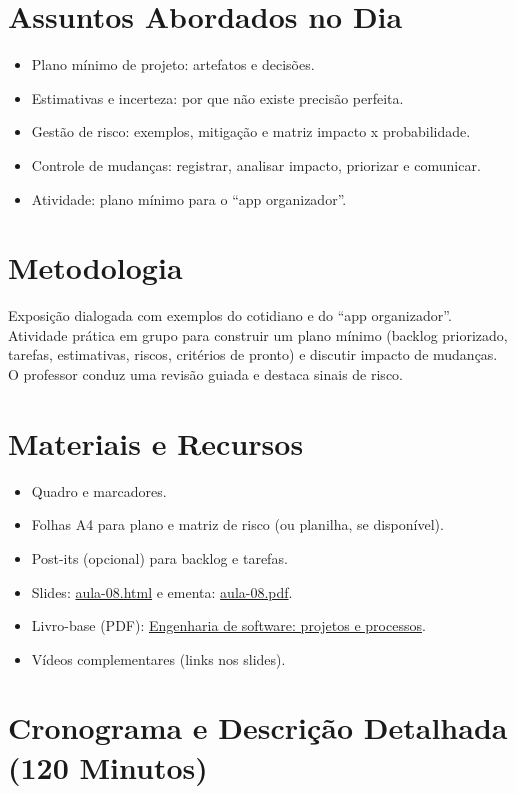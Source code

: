 \documentclass[12pt,a4paper]{article}
\begin{document}
\section{Assuntos Abordados no Dia}
\begin{itemize}[leftmargin=*,itemsep=0.25em]
  \item Plano mínimo de projeto: artefatos e decisões.
  \item Estimativas e incerteza: por que não existe precisão perfeita.
  \item Gestão de risco: exemplos, mitigação e matriz impacto x probabilidade.
  \item Controle de mudanças: registrar, analisar impacto, priorizar e comunicar.
  \item Atividade: plano mínimo para o ``app organizador''.
\end{itemize}

\section{Metodologia}
Exposição dialogada com exemplos do cotidiano e do ``app organizador''. Atividade prática em grupo para construir um plano mínimo (backlog priorizado, tarefas, estimativas, riscos, critérios de pronto) e discutir impacto de mudanças. O professor conduz uma revisão guiada e destaca sinais de risco.

\section{Materiais e Recursos}
\begin{itemize}[leftmargin=*,itemsep=0.25em]
  \item Quadro e marcadores.
  \item Folhas A4 para plano e matriz de risco (ou planilha, se disponível).
  \item Post-its (opcional) para backlog e tarefas.
  \item Slides: \href{aula-08.html}{aula-08.html} e ementa: \href{aula-08.pdf}{aula-08.pdf}.
  \item Livro-base (PDF): \href{../99-Materiais/Engenharia%20de%20software%20projetos%20e%20processos%20by%20Wilson%20de%20P%C3%A1dua%20Paula%20Filho%20.epub.pdf}{Engenharia de software: projetos e processos}.
  \item Vídeos complementares (links nos slides).
\end{itemize}

\section{Cronograma e Descrição Detalhada (120 Minutos)}
\end{document}
